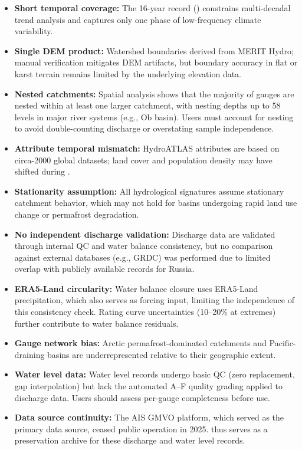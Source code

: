 \begin{itemize}
    \item \textbf{Short temporal coverage:} The 16-year record (\years) constrains multi-decadal trend analysis and captures only one phase of low-frequency climate variability.
    \item \textbf{Single DEM product:} Watershed boundaries derived from MERIT Hydro; manual verification mitigates DEM artifacts, but boundary accuracy in flat or karst terrain remains limited by the underlying elevation data.
    \item \textbf{Nested catchments:} Spatial analysis shows that the majority of gauges are nested within at least one larger catchment, with nesting depths up to 58 levels in major river systems (e.g., Ob basin). Users must account for nesting to avoid double-counting discharge or overstating sample independence.
    \item \textbf{Attribute temporal mismatch:} HydroATLAS attributes are based on circa-2000 global datasets; land cover and population density may have shifted during \years.
    \item \textbf{Stationarity assumption:} All hydrological signatures assume stationary catchment behavior, which may not hold for basins undergoing rapid land use change or permafrost degradation.
    \item \textbf{No independent discharge validation:} Discharge data are validated through internal QC and water balance consistency, but no comparison against external databases (e.g., GRDC) was performed due to limited overlap with publicly available records for Russia.
    \item \textbf{ERA5-Land circularity:} Water balance closure uses ERA5-Land precipitation, which also serves as forcing input, limiting the independence of this consistency check. Rating curve uncertainties (10--20\% at extremes) further contribute to water balance residuals.
    \item \textbf{Gauge network bias:} Arctic permafrost-dominated catchments and Pacific-draining basins are underrepresented relative to their geographic extent.
    \item \textbf{Water level data:} Water level records undergo basic QC (zero replacement, gap interpolation) but lack the automated A--F quality grading applied to discharge data. Users should assess per-gauge completeness before use.
    \item \textbf{Data source continuity:} The AIS GMVO platform, which served as the primary data source, ceased public operation in 2025. \dataset thus serves as a preservation archive for these discharge and water level records.
\end{itemize}

